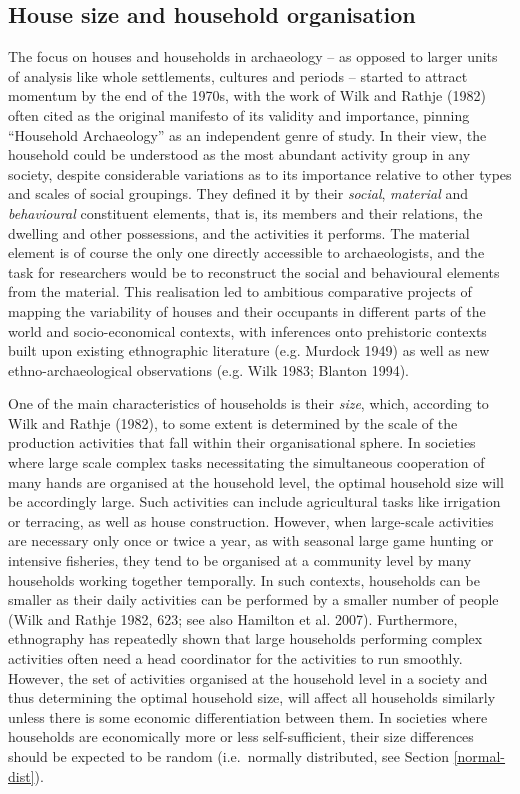\documentclass[
  12pt,
  a4paper, twoside]{book}
\begin{document}
\hypertarget{house-size-and-household-organisation}{%
\subsection{House size and household organisation}\label{house-size-and-household-organisation}}

The focus on houses and households in archaeology -- as opposed to larger units of analysis like whole settlements, cultures and periods -- started to attract momentum by the end of the 1970s, with the work of Wilk and Rathje (1982) often cited as the original manifesto of its validity and importance, pinning ``Household Archaeology'' as an independent genre of study. In their view, the household could be understood as the most abundant activity group in any society, despite considerable variations as to its importance relative to other types and scales of social groupings. They defined it by their \emph{social}, \emph{material} and \emph{behavioural} constituent elements, that is, its members and their relations, the dwelling and other possessions, and the activities it performs. The material element is of course the only one directly accessible to archaeologists, and the task for researchers would be to reconstruct the social and behavioural elements from the material. This realisation led to ambitious comparative projects of mapping the variability of houses and their occupants in different parts of the world and socio-economical contexts, with inferences onto prehistoric contexts built upon existing ethnographic literature (e.g. Murdock 1949) as well as new ethno-archaeological observations (e.g. Wilk 1983; Blanton 1994).

One of the main characteristics of households is their \emph{size}, which, according to Wilk and Rathje (1982), to some extent is determined by the scale of the production activities that fall within their organisational sphere. In societies where large scale complex tasks necessitating the simultaneous cooperation of many hands are organised at the household level, the optimal household size will be accordingly large. Such activities can include agricultural tasks like irrigation or terracing, as well as house construction. However, when large-scale activities are necessary only once or twice a year, as with seasonal large game hunting or intensive fisheries, they tend to be organised at a community level by many households working together temporally. In such contexts, households can be smaller as their daily activities can be performed by a smaller number of people (Wilk and Rathje 1982, 623; see also Hamilton et al. 2007). Furthermore, ethnography has repeatedly shown that large households performing complex activities often need a head coordinator for the activities to run smoothly. However, the set of activities organised at the household level in a society and thus determining the optimal household size, will affect all households similarly unless there is some economic differentiation between them. In societies where households are economically more or less self-sufficient, their size differences should be expected to be random (i.e.~normally distributed, see Section \ref{normal-dist}).
\end{document}

